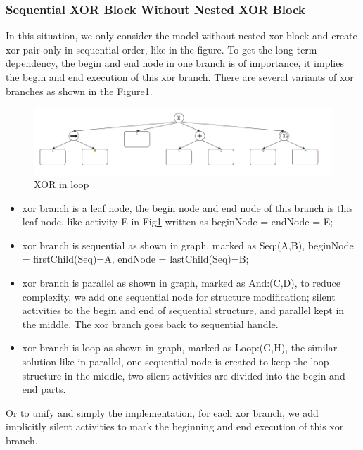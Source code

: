 \documentclass[]{article}
\begin{document}
\subsubsection{Sequential XOR Block Without Nested XOR Block}
In this situation, we only consider the model without nested xor block and create xor pair only in sequential order, like in the figure.
To get the long-term dependency, the begin and end node in one branch is of importance, it implies the begin and end execution of this xor branch. There are several variants of xor branches as shown in the Figure\ref{fig:xor_branches}.
\begin{figure}[h!]
	\includegraphics[width=\textwidth]{PT08_xor_branches.png}
	\caption{XOR in loop}
	\label{fig:xor_branches}
\end{figure}
\begin{itemize}
	\item xor branch is a leaf node, the begin node and end node of this branch is this leaf node, like activity E in Fig\ref{fig:xor_branches} written as beginNode = endNode = E;
	\item xor branch is sequential as shown in graph, marked as Seq:(A,B), beginNode = firstChild(Seq)=A, endNode = lastChild(Seq)=B;
	\item xor branch is parallel as shown in graph, marked as And:(C,D), to reduce complexity, we add one sequential node for structure modification; silent activities to the begin and end of sequential structure, and parallel kept in the middle. The xor branch goes back to sequential handle.
	\item xor branch is loop as shown in graph, marked as Loop:(G,H), the similar solution like in parallel, one sequential node is created to keep the loop structure in the middle, two silent activities are divided into the begin and end parts.
\end{itemize}
Or to unify and simply the implementation, for each xor branch, we add implicitly silent activities to mark the beginning and end execution of this xor branch.\\\
\end{document}
